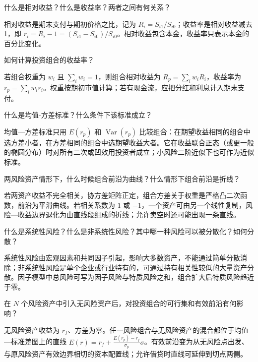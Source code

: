 
\begin{problem}
 什么是相对收益？什么是收益率？两者之间有何关系？
\end{problem}
\begin{solution}
相对收益是期末支付与期初价格之比，记为 $R_i=S_{i1}/S_{i0}$；收益率是相对收益减去 1，即 $r_i=R_i-1=(S_{i1}-S_{i0})/S_{i0}$。相对收益包含本金，收益率只表示本金的百分比变化。
\end{solution}
\begin{problem}
 如何计算投资组合的收益率？
\end{problem}
\begin{solution}
若组合权重为 $w_i$ 且 $\sum_iw_i=1$，则组合相对收益为 $R_p=\sum_iw_iR_i$，收益率为 $r_p=\sum_iw_ir_i$。权重按期初市值计算；若有现金流，应把分红和利息计入期末支付。
\end{solution}
\begin{problem}
 什么是均值-方差标准？什么条件下该标准成立？
\end{problem}
\begin{solution}
均值—方差标准只用 $E(r_p)$ 和 $\operatorname{Var}(r_p)$ 比较组合：在期望收益相同的组合中选方差小者，在方差相同的组合中选期望收益大者。它在收益联合正态（或更一般的椭圆分布）时对所有二次或凹效用投资者成立；小风险二阶近似下也可作为近似标准。
\end{solution}
\begin{problem}
 两风险资产情形下，什么时候组合前沿为曲线？什么情形下组合前沿是折线？
\end{problem}
\begin{solution}
若两资产收益不完全相关，协方差矩阵正定，组合方差关于权重是严格凸二次函数，前沿为平滑曲线。若相关系数为 $1$ 或 $-1$，一个资产可由另一个线性复制，风险—收益边界退化为由直线段组成的折线；允许卖空时还可能出现一条直线。
\end{solution}
\begin{problem}
 什么是系统性风险？什么是非系统性风险？其中哪一种风险可以被分散化？如何分散？
\end{problem}
\begin{solution}
系统性风险由宏观因素和共同因子引起，影响大多数资产，不能通过简单分散消除；非系统性风险是单个企业或行业特有的，可通过持有相关性较低的大量资产分散。因子模型中总风险可写为因子风险与特质风险之和，组合扩大后特质风险趋近于零。
\end{solution}
\begin{problem}
 在 $N$ 个风险资产中引入无风险资产后，对投资组合的可行集和有效前沿有何影响？
\end{problem}
\begin{solution}
无风险资产收益为 $r_f$、方差为零。任一风险组合与无风险资产的混合都位于均值—标准差图上的直线 $E(r)=r_f+\frac{E(r_p)-r_f}{\sigma_p}\sigma$。有效前沿变为从无风险点出发、与原风险资产有效边界相切的资本配置线；允许借贷时直线可延伸到切点两侧。
\end{solution}

